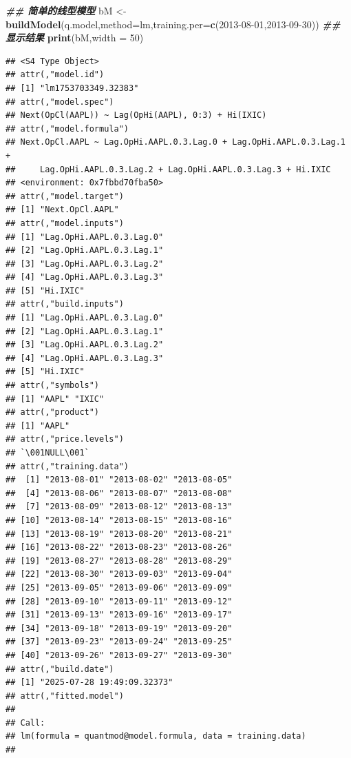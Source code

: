 \documentclass[]{ctexbook}
\newenvironment{Shaded}{\begin{snugshade}}{\end{snugshade}}
\newcommand{\AttributeTok}[1]{\textcolor[rgb]{0.13,0.29,0.53}{#1}}
\newcommand{\DecValTok}[1]{\textcolor[rgb]{0.00,0.00,0.81}{#1}}
\newcommand{\DocumentationTok}[1]{\textcolor[rgb]{0.56,0.35,0.01}{\textbf{\textit{#1}}}}
\newcommand{\FunctionTok}[1]{\textcolor[rgb]{0.13,0.29,0.53}{\textbf{#1}}}
\newcommand{\NormalTok}[1]{#1}
\newcommand{\OtherTok}[1]{\textcolor[rgb]{0.56,0.35,0.01}{#1}}
\newcommand{\StringTok}[1]{\textcolor[rgb]{0.31,0.60,0.02}{#1}}
\begin{document}
\begin{Shaded}
\begin{Highlighting}[]
\DocumentationTok{\#\# 简单的线型模型}
\NormalTok{bM }\OtherTok{\textless{}{-}} \FunctionTok{buildModel}\NormalTok{(q.model,}\AttributeTok{method=}\StringTok{\textquotesingle{}lm\textquotesingle{}}\NormalTok{,}\AttributeTok{training.per=}\FunctionTok{c}\NormalTok{(}\StringTok{\textquotesingle{}2013{-}08{-}01\textquotesingle{}}\NormalTok{,}\StringTok{\textquotesingle{}2013{-}09{-}30\textquotesingle{}}\NormalTok{))}
\DocumentationTok{\#\# 显示结果}
\FunctionTok{print}\NormalTok{(bM,}\AttributeTok{width =} \DecValTok{50}\NormalTok{)}
\end{Highlighting}
\end{Shaded}

\begin{verbatim}
## <S4 Type Object>
## attr(,"model.id")
## [1] "lm1753703349.32383"
## attr(,"model.spec")
## Next(OpCl(AAPL)) ~ Lag(OpHi(AAPL), 0:3) + Hi(IXIC)
## attr(,"model.formula")
## Next.OpCl.AAPL ~ Lag.OpHi.AAPL.0.3.Lag.0 + Lag.OpHi.AAPL.0.3.Lag.1 + 
##     Lag.OpHi.AAPL.0.3.Lag.2 + Lag.OpHi.AAPL.0.3.Lag.3 + Hi.IXIC
## <environment: 0x7fbbd70fba50>
## attr(,"model.target")
## [1] "Next.OpCl.AAPL"
## attr(,"model.inputs")
## [1] "Lag.OpHi.AAPL.0.3.Lag.0"
## [2] "Lag.OpHi.AAPL.0.3.Lag.1"
## [3] "Lag.OpHi.AAPL.0.3.Lag.2"
## [4] "Lag.OpHi.AAPL.0.3.Lag.3"
## [5] "Hi.IXIC"                
## attr(,"build.inputs")
## [1] "Lag.OpHi.AAPL.0.3.Lag.0"
## [2] "Lag.OpHi.AAPL.0.3.Lag.1"
## [3] "Lag.OpHi.AAPL.0.3.Lag.2"
## [4] "Lag.OpHi.AAPL.0.3.Lag.3"
## [5] "Hi.IXIC"                
## attr(,"symbols")
## [1] "AAPL" "IXIC"
## attr(,"product")
## [1] "AAPL"
## attr(,"price.levels")
## `\001NULL\001`
## attr(,"training.data")
##  [1] "2013-08-01" "2013-08-02" "2013-08-05"
##  [4] "2013-08-06" "2013-08-07" "2013-08-08"
##  [7] "2013-08-09" "2013-08-12" "2013-08-13"
## [10] "2013-08-14" "2013-08-15" "2013-08-16"
## [13] "2013-08-19" "2013-08-20" "2013-08-21"
## [16] "2013-08-22" "2013-08-23" "2013-08-26"
## [19] "2013-08-27" "2013-08-28" "2013-08-29"
## [22] "2013-08-30" "2013-09-03" "2013-09-04"
## [25] "2013-09-05" "2013-09-06" "2013-09-09"
## [28] "2013-09-10" "2013-09-11" "2013-09-12"
## [31] "2013-09-13" "2013-09-16" "2013-09-17"
## [34] "2013-09-18" "2013-09-19" "2013-09-20"
## [37] "2013-09-23" "2013-09-24" "2013-09-25"
## [40] "2013-09-26" "2013-09-27" "2013-09-30"
## attr(,"build.date")
## [1] "2025-07-28 19:49:09.32373"
## attr(,"fitted.model")
## 
## Call:
## lm(formula = quantmod@model.formula, data = training.data)
## 

\end{verbatim}
\end{document}

